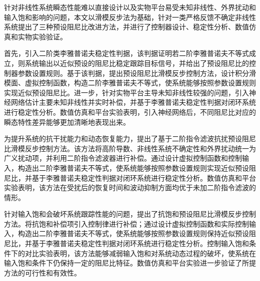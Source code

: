 
\begin{cabstract}
针对非线性系统瞬态性能难以直接设计以及实物平台易受未知非线性、外界扰动和输入饱和影响的问题，本文以滑模反步法为基础，针对一类严格反馈不确定非线性系统提出了三种预设阻尼比改进方法，并进行了控制器设计、稳定性分析、数值仿真和实物实验验证。

首先，引入二阶类李雅普诺夫稳定性判据，该判据证明若二阶李雅普诺夫不等式成立，则系统输出以近似预设的阻尼比稳定跟踪目标信号，并给出了预设阻尼比的控制器参数设置规则。基于该判据，提出预设阻尼比滑模反步控制方法，设计积分滑模面、虚拟控制函数，构造二阶李雅普诺夫不等式，使系统能够按照参数设置规则实现近似预设阻尼比。进一步，针对实物平台主导未知非线性较强的问题，引入神经网络估计主要未知非线性并实时补偿，并基于李雅普诺夫稳定性判据对闭环系统进行稳定性分析。数值仿真和平台实验表明，引入神经网络后，不同阻尼比对应的瞬态特性差异能够更加清晰地表现出来。

为提升系统的抗干扰能力和动态恢复能力，提出了基于二阶指令滤波抗扰预设阻尼比滑模反步控制方法。该方法将高阶导数、非线性系统不确定性和外界扰动统一为广义扰动项，并利用二阶指令滤波器进行补偿。通过设计虚拟控制函数和控制输入，构造出二阶李雅普诺夫不等式，使系统能够按照参数设置规则实现近似预设阻尼比，并基于李雅普诺夫稳定性判据对闭环系统进行稳定性分析。数值仿真和平台实验表明，该方法在受扰后的恢复时间和波动抑制方面均优于未加二阶指令滤波的情形。

针对输入饱和会破坏系统跟踪性能的问题，提出了抗饱和预设阻尼比滑模反步控制方法。将抗饱和补偿项引入控制律进行补偿；通过设计虚拟控制函数和实际控制输入，构造出二阶李雅普诺夫不等式，使系统能够按照参数设置规则保持近似预设阻尼比，并基于李雅普诺夫稳定性判据对闭环系统进行稳定性分析。控制输入饱和条件下的对比实验表明，该方法能够减弱输入饱和对系统动态过程的破坏，使系统在输入饱和条件下仍保持一定的阻尼比特征。数值仿真和平台实验进一步验证了所提方法的可行性和有效性。

\end{cabstract}

